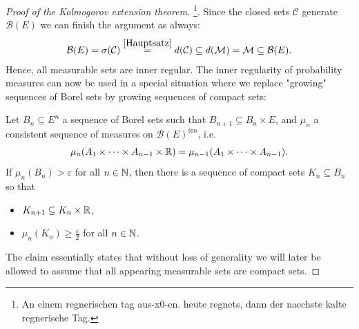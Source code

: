 \begin{proof}[Proof of the Kolmogorov extension theorem]
	
	\footnote{An einem regnerischen tag aus-x0-en. heute regnets, dann der naechste kalte regnerische Tag.}. Since the closed sets $\mathcal C$ generate $\mathcal B(E)$ we can finish the argument as always:
	\begin{align*}
		\mathcal B(E)=\sigma(\mathcal C)  \overset{\ref{Hauptsatz}}{=}d(\mathcal C)\subseteq d(\mathcal M)=\mathcal M \subseteq \mathcal B(E).
	\end{align*}
	Hence, all measurable sets are inner regular. 
The inner regularity of probability measures can now be used in a special situation where we replace "growing"{} sequences of Borel sets by growing sequences of compact sets:
\begin{lstep}
	Let $B_n\subseteq E^n$ a sequence of Borel sets such that $B_{n+1}\subseteq B_{n}\times E$, and $\mu_n$ a consistent sequence of measures on $\mathcal B(E)^{\otimes n}$, i.e. 
	\begin{align*}
		\mu_n(A_1\times\cdots \times A_{n-1}\times \mathbb{R})=\mu_{n-1}(A_1\times \cdots \times A_{n-1}).		
	\end{align*}	
	If $\mu_n(B_n)>\varepsilon$ for all $n\in\mathbb{N}$, then there is a sequence of compact sets $K_n\subseteq B_n$ so that
		\begin{itemize}
			\item $K_{n+1}\subseteq K_n\times\mathbb{R}$,
			\item $\mu_n(K_n)\geq \frac{\varepsilon}{2}$ for all $n\in\mathbb{N}$.
		\end{itemize}
\end{lstep}
The claim essentially states that without loss of generality we will later be allowed to assume that all appearing measurable sets are compact sets.

\end{proof}
